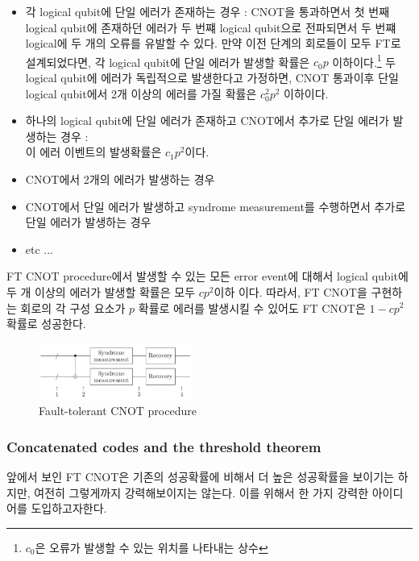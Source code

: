 \begin{itemize}
    \item 각 logical qubit에 단일 에러가 존재하는 경우 : CNOT을 통과하면서 첫 번째 logical qubit에 존재하던 에러가 두 번쨰 logical qubit으로 전파되면서 두 번쨰 logical에 두 개의 오류를 유발할 수 있다. 만약 이전 단계의 회로들이 모두 FT로 설계되었다면, 각 logical qubit에 단일 에러가 발생할 확률은 $c_0p$ 이하이다.\footnote{$c_0$은 오류가 발생할 수 있는 위치를 나타내는 상수} 두 logical qubit에 에러가 독립적으로 발생한다고 가정하면, CNOT 통과이후 단일 logical qubit에서 2개 이상의 에러를 가질 확률은 $c_0^2p^2$ 이하이다.
    \item 하나의 logical qubit에 단일 에러가 존재하고 CNOT에서 추가로 단일 에러가 발생하는 경우 :\\ 이 에러 이벤트의 발생확률은 $c_1 p^2$이다.
    \item CNOT에서 2개의 에러가 발생하는 경우
    \item CNOT에서 단일 에러가 발생하고 syndrome measurement를 수행하면서 추가로 단일 에러가 발생하는 경우
    \item etc ...
\end{itemize}

FT CNOT procedure에서 발생할 수 있는 모든 error event에 대해서 logical qubit에 두 개 이상의 에러가 발생할 확률은 모두 $cp^2$이하 이다. 따라서, FT CNOT을 구현하는 회로의 각 구성 요소가 $p$ 확률로 에러를 발생시킬 수 있어도 FT CNOT은 $1 - cp^2$ 확률로 성공한다.

\begin{figure}[h]
    \centering
    \includegraphics[width=0.45\textwidth]{figures/C7_FT_CNOT_high.png}
    \caption{Fault-tolerant CNOT procedure}
    \label{fig:cnot-detail}
\end{figure}

\subsubsection{Concatenated codes and the threshold theorem}
앞에서 보인 FT CNOT은 기존의 성공확률에 비해서 더 높은 성공확률을 보이기는 하지만, 여전히 그렇게까지 강력해보이지는 않는다. 이를 위해서 한 가지 강력한 아이디어를 도입하고자한다.

